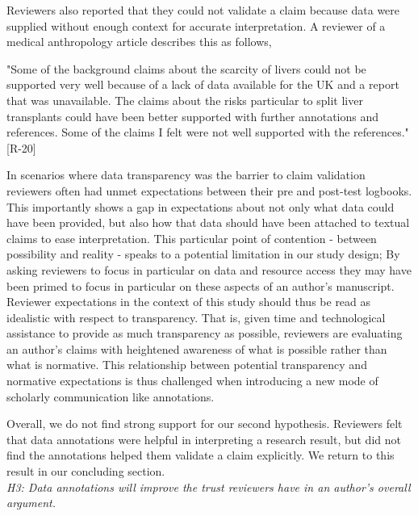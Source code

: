 \documentclass[sigchi]{acmart}
\begin{document}
Reviewers also reported that they could not validate a claim because data were supplied without enough context for accurate interpretation. A reviewer of a medical anthropology article describes this as follows, 
\begin{displayquote}
"Some of the background claims about the scarcity of livers could not be supported very well because of a lack of data available for the UK and a report that was unavailable. The claims about the risks particular to split liver transplants could have been better supported with further annotations and references. Some of the claims I felt were not well supported with the references." [R-20]
\end{displayquote}
In scenarios where data transparency was the barrier to claim validation reviewers often had unmet expectations between their pre and post-test logbooks. This importantly shows a gap in expectations about not only what data could have been provided, but also how that data should have been attached to textual claims to ease interpretation. This particular point of contention - between possibility and reality - speaks to a potential limitation in our study design; By asking reviewers to focus in particular on data and resource access they may have been primed to focus in particular on these aspects of an author's manuscript. Reviewer expectations in the context of this study should thus be read as idealistic with respect to transparency. That is, given time and technological assistance to provide as much transparency as possible, reviewers are evaluating an author's claims with heightened awareness of what is possible rather than what is normative. This relationship between potential transparency and normative expectations is thus challenged when introducing a new mode of scholarly communication like annotations. 

Overall, we do not find strong support for our second hypothesis. Reviewers felt that data annotations were helpful in interpreting a research result, but did not find the annotations helped them validate a claim explicitly. We return to this result in our concluding section.\\ 

\textit{H3: Data annotations will improve the trust reviewers have in an author’s overall argument.}\\
\end{document}
